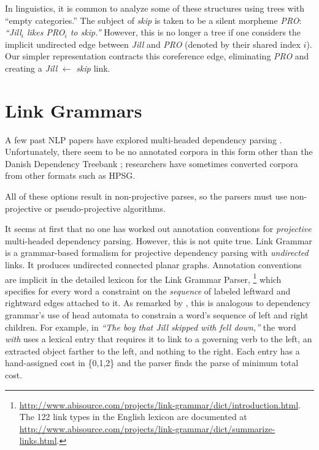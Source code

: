 \documentclass[11pt]{article}
\newcommand{\Note}[4][]{\todo[author=#2,color=#3,fancyline,#1]{#4}}
\newcommand{\noteJE}[2][]{\Note[#1]{JE}{green!40}{#2}}
\begin{document}
In linguistics, it is common to analyze some of these structures using trees with ``empty categories.''  The subject of {\em skip} is taken to be a silent morpheme {\em PRO}:
{\em ``Jill$_i$ likes PRO$_i$ to skip.''}  However, this is no longer a tree if one considers the implicit undirected edge between {\em Jill} and {\em PRO} (denoted by their shared index $i$).  Our simpler representation contracts this coreference edge, eliminating {\em PRO} and creating a {\em Jill} $\leftarrow$ {\em skip} link.  

\section{Link Grammars}

A few past NLP papers have explored multi-headed dependency parsing \cite{buchkromann-2006,mcdonald-pereira-2006,sagae-tsujii-2008,gomezrodriguez-nivre-2013}.  Unfortunately, there seem to be no annotated corpora in this form other than the Danish Dependency Treebank \cite{kromann-2003}; researchers have sometimes converted corpora from other formats such as HPSG.  

All of these options result in non-projective parses, so the parsers must use non-projective or pseudo-projective algorithms.

It seems at first that no one has worked out annotation conventions for {\em projective} multi-headed dependency parsing.  However, this is not quite true.  Link Grammar \cite{SleatorTemperly91} is a grammar-based formalism for projective dependency parsing with {\em undirected} links.  It produces undirected connected planar graphs.  Annotation conventions are implicit in the detailed lexicon for the Link Grammar Parser,\noteJE{check caps}%
\footnote{\url{http://www.abisource.com/projects/link-grammar/dict/introduction.html}.  The 122 link types in the English lexicon are documented at \url{http://www.abisource.com/projects/link-grammar/dict/summarize-links.html}.} 
which specifies for every word a constraint on the {\em sequence} of labeled leftward and rightward edges attached to it.  As remarked by , this is analogous to dependency grammar's use of head automata to constrain a word's sequence of left and right children.  For example, in {\em ``The boy that Jill skipped with fell down,''} the word {\em with} uses a lexical entry that requires it to link to a governing verb to the left, an extracted object farther to the left, and nothing to the right.  Each entry has a hand-assigned cost in \{0,1,2\} and the parser finds the parse of minimum total cost.
\end{document}
